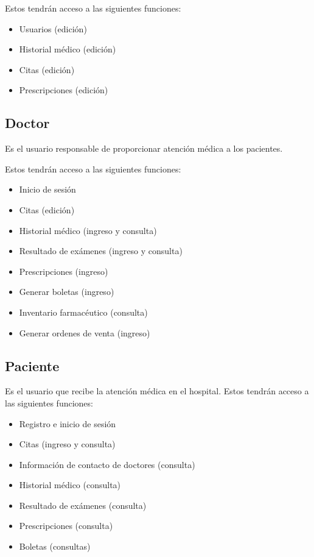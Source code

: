 \documentclass[10pt]{article}
\newlength{\x}
\begin{document}
Estos tendrán acceso a las siguientes funciones:

\begin{itemize}
    \item Usuarios (edición)
    \item Historial médico (edición)
    \item Citas (edición)
    \item Prescripciones (edición)
\end{itemize}


\subsection{Doctor}
Es el usuario responsable de proporcionar atención médica a los pacientes.

Estos tendrán acceso a las siguientes funciones:

\begin{itemize}
    \item Inicio de sesión
    \item Citas (edición)
    \item Historial médico (ingreso y consulta)
    \item Resultado de exámenes (ingreso y consulta)
    \item Prescripciones (ingreso)
    \item Generar boletas (ingreso)
    \item Inventario farmacéutico (consulta)
    \item Generar ordenes de venta (ingreso)
\end{itemize}

\subsection{Paciente}
Es el usuario que recibe la atención médica en el hospital. 
Estos tendrán acceso a las siguientes funciones:

\begin{itemize}
    \item Registro e inicio de sesión
    \item Citas (ingreso y consulta)
    \item Información de contacto de doctores (consulta)
    \item Historial médico (consulta)
    \item Resultado de exámenes (consulta)
    \item Prescripciones (consulta)
    \item Boletas (consultas)

\end{itemize}
\end{document}
